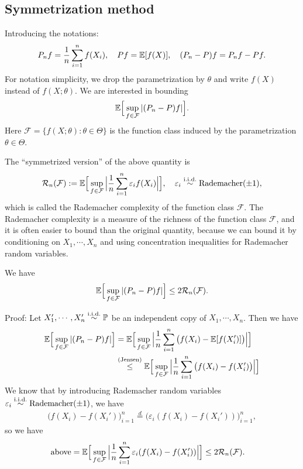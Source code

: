 \documentclass[11pt,letterpaper]{article}
\numberwithin{theorem}{lecture}
\numberwithin{proposition}{lecture}
\numberwithin{lemma}{lecture}
\numberwithin{claim}{lecture}
\numberwithin{corollary}{lecture}
\numberwithin{definition}{lecture}
\numberwithin{conjecture}{lecture}
\numberwithin{remark}{lecture}
\numberwithin{example}{lecture}
\numberwithin{equation}{lecture}
\begin{document}
\subsection{Symmetrization method}
Introducing the notations:
\begin{align*}
  P_n f = \frac{1}{n} \sum_{i = 1}^n f (X_i), \quad P f = {\mathbb{E}} [f (X)], \quad (P_n - P) f = P_n f - P f.
\end{align*}
For notation simplicity, we drop the parametrization by $\theta$ and write $f (X)$ instead of $f (X; \theta)$. We are interested in bounding
\begin{align*}
  {\mathbb{E}} \Big[\sup_{f \in \mathcal{F}} |(P_n - P) f| \Big].
\end{align*}
Here $\mathcal{F} = \{f (X; \theta): \theta \in \Theta\}$ is the function class induced by the parametrization $\theta \in \Theta$.

The ``symmetrized version'' of the above quantity is
\begin{align*}
  \mathcal{R}_n (\mathcal{F}) := {\mathbb{E}} \Big[ \sup_{f \in \mathcal{F}} \Big| \frac{1}{n} \sum_{i = 1}^n \varepsilon_i f (X_i) \Big| \Big], \quad \varepsilon_i \overset{\mathrm{i.i.d.}}{\sim} \mathrm{Rademacher} (\pm 1),
\end{align*}
which is called the Rademacher complexity of the function class $\mathcal{F}$. The Rademacher complexity is a measure of the richness of the function class $\mathcal{F}$, and it is often easier to bound than the original quantity, because we can bound it by conditioning on $X_1, \cdots, X_n$ and using concentration inequalities for Rademacher random variables.

\begin{theorem}[symmetrization]
  We have
  \begin{align*}
    {\mathbb{E}} \Big[\sup_{f \in \mathcal{F}} |(P_n - P) f| \Big] \leq 2 \mathcal{R}_n (\mathcal{F}).
  \end{align*}
\end{theorem}
Proof: Let $X_1', \cdots, X_n' \overset{\mathrm{i.i.d.}}{\sim} {\mathbb{P}}$ be an independent copy of $X_1, \cdots, X_n$. Then we have
\begin{align*}
{\mathbb{E}} \Big[ \sup_{f \in \mathcal{F}} |(P_n - P)f| \Big] &= {\mathbb{E}} \Big[ \sup_{f \in \mathcal{F}} \Big| \frac{1}{n} \sum_{i = 1}^n \big(f (X_i) - {\mathbb{E}} [f (X_i')] \big) \Big| \Big]\\
&\overset{(\text{Jensen})}{\leq} {\mathbb{E}} \Big[ \sup_{f \in \mathcal{F}} \Big| \frac{1}{n} \sum_{i = 1}^n \big(f (X_i) - f (X_i') \big) \Big| \Big]
\end{align*}
We know that by introducing Rademacher random variables $\varepsilon_i \overset{\mathrm{i.i.d.}}{\sim} \mathrm{Rademacher} (\pm 1)$, we have
\begin{align*}
  \big( f(X_i) - f (X_i') \big)_{i = 1}^n \overset{d}{=} \big( \varepsilon_i (f(X_i) - f (X_i')) \big)_{i = 1}^n,
\end{align*}
so we have
\begin{align*}
  \text{above} &= {\mathbb{E}} \Big[ \sup_{f \in \mathcal{F}} \Big| \frac{1}{n} \sum_{i = 1}^n \varepsilon_i (f(X_i) - f (X_i')) \Big| \Big] \leq 2 \mathcal{R}_n (\mathcal{F}).
\end{align*}
\end{document}
